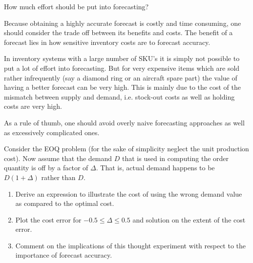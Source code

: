 \begin{question}
How much effort should be put into forecasting?

\end{question}

  \begin{solution}

	Because obtaining a highly accurate forecast is costly and time consuming, one should consider the trade off between its benefits and costs. The benefit of a forecast lies in how sensitive inventory costs are to forecast accuracy. 
	
	In inventory systems with a large number of SKU's it is simply not possible to put a lot of effort into forecasting. But for very expensive items which are sold rather infrequently (say a diamond ring or an aircraft spare part) the value of having a better forecast can be very high. This is mainly due to the cost of the mismatch between supply and demand, i.e. stock-out costs as well as holding costs are very high. 
	
	As a rule of thumb, one should avoid overly naive forecasting approaches as well as excessively complicated ones. 
  \end{solution}


\begin{question}
Consider the EOQ problem (for the sake of simplicity neglect the unit production cost). Now assume that the demand $D$ that is used in computing the order quantity is off by a factor of $\Delta$. That is, actual demand happens to be $D(1+\Delta)$ rather than $D$. 
\begin{enumerate}
\item Derive an expression to illustrate the cost of using the wrong demand value as compared to the optimal cost. 
\item Plot the cost error for $-0.5\leq \Delta\leq 0.5$ and solution on the extent of the cost error.
\item Comment on the implications of this thought experiment with respect to the importance of forecast accuracy.
\end{enumerate}
\end{question}


